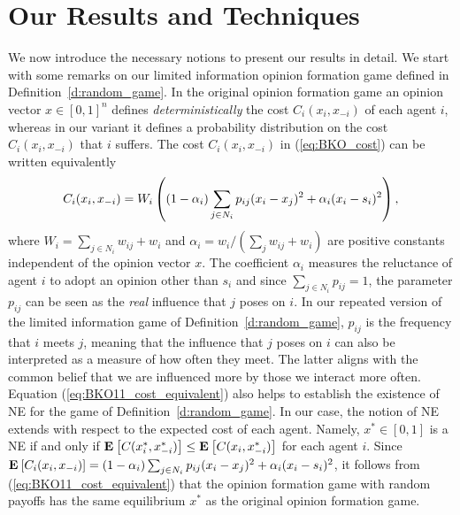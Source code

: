 \section{Our Results and Techniques}
We now introduce the necessary notions to present our results in detail.
We start with some remarks on our limited information opinion formation game
defined in Definition~\ref{d:random_game}.
In the original opinion formation game an opinion vector $x\in [0,1]^n$ defines
\emph{deterministically} the cost $C_i(x_i,x_{-i})$ of each agent $i$,
whereas in our variant it defines a probability distribution on the cost
$C_i(x_i,x_{-i})$ that $i$ suffers.
The cost $C_i(x_i,x_{-i})$ in (\ref{eq:BKO_cost}) can be written equivalently
\begin{equation}\label{eq:BKO11_cost_equivalent}
  C_i(x_i,x_{-i}) =
  W_i\left( (1-\alpha_i)\sum_{j \in N_i} p_{ij}(x_i-x_j)^2
  + \alpha_i(x_i-s_i)^2\right),
\end{equation}
where $W_i=\sum_{j\in N_i}w_{ij} + w_i$ and
$\alpha_i = w_i/(\sum_{j} w_{ij} + w_i)$ are positive constants independent of
the opinion vector $x$. 
The coefficient $\alpha_i$ measures the reluctance of agent
$i$ to adopt an opinion other than $s_i$ and since $\sum_{j \in N_i}p_{ij}=1$,
the parameter $p_{ij}$ can be seen as the \emph{real} influence that $j$ poses on $i$.
In our repeated version of the limited information game of Definition~\ref{d:random_game},
$p_{ij}$ is the frequency that $i$ meets $j$, meaning that the influence that
$j$ poses on $i$ can also be interpreted as a measure
of how often they meet. The latter aligns with the common belief
that we are influenced more by those we interact more often.
Equation (\ref{eq:BKO11_cost_equivalent}) also helps to establish the existence
of NE for the game of Definition~\ref{d:random_game}.
In our case, the notion of NE extends with respect to the expected cost of each
agent. Namely, $x^* \in [0,1]$ is a NE if and only if
$\Exp{C(x_i^*, x_{-i}^*)} \leq \Exp{C(x_i, x_{-i}^*)}$
for each agent $i$.
Since
$\bm{\mathrm{E}}_{} \left[ C_i(x_i,x_{-i}) \right]=
(1-\alpha_i) \sum_{j \in N_i}p_{ij}(x_i-x_j)^2 + \alpha_i(x_i-s_i)^2 $,
it follows from (\ref{eq:BKO11_cost_equivalent}) that the
opinion formation game with random payoffs has the same equilibrium $x^*$ as
the original opinion formation game.

